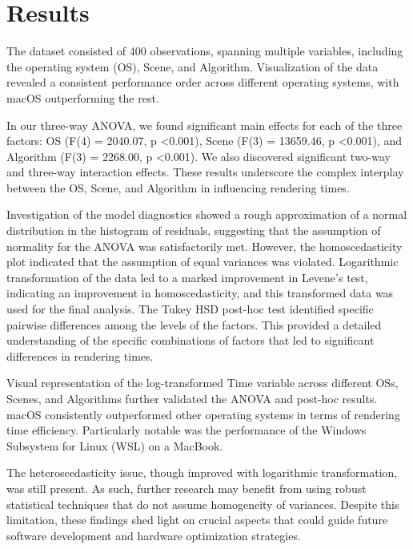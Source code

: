 \documentclass[conference]{IEEEtran}
\begin{document}
\section{Results}
The dataset consisted of 400 observations, spanning multiple variables, including the operating system (OS), Scene, and Algorithm. Visualization of the data revealed a consistent performance order across different operating systems, with macOS outperforming the rest.

In our three-way ANOVA, we found significant main effects for each of the three factors: OS (F(4) = 2040.07, p \textless 0.001), Scene (F(3) = 13659.46, p \textless 0.001), and Algorithm (F(3) = 2268.00, p \textless 0.001). We also discovered significant two-way and three-way interaction effects. These results underscore the complex interplay between the OS, Scene, and Algorithm in influencing rendering times.

Investigation of the model diagnostics showed a rough approximation of a normal distribution in the histogram of residuals, suggesting that the assumption of normality for the ANOVA was satisfactorily met. However, the homoscedasticity plot indicated that the assumption of equal variances was violated. Logarithmic transformation of the data led to a marked improvement in Levene's test, indicating an improvement in homoscedasticity, and this transformed data was used for the final analysis.
The Tukey HSD post-hoc test identified specific pairwise differences among the levels of the factors. This provided a detailed understanding of the specific combinations of factors that led to significant differences in rendering times.

Visual representation of the log-transformed Time variable across different OSs, Scenes, and Algorithms further validated the ANOVA and post-hoc results. macOS consistently outperformed other operating systems in terms of rendering time efficiency. Particularly notable was the performance of the Windows Subsystem for Linux (WSL) on a MacBook.

The heteroscedasticity issue, though improved with logarithmic transformation, was still present. As such, further research may benefit from using robust statistical techniques that do not assume homogeneity of variances. Despite this limitation, these findings shed light on crucial aspects that could guide future software development and hardware optimization strategies.
\end{document}
